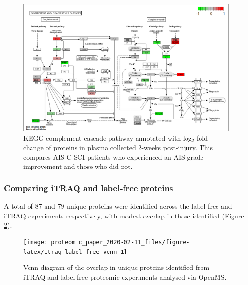 \documentclass[9pt,lineno]{elife}
\begin{document}
\begin{figure}

{\centering \includegraphics[width=18.31in]{figures/kegg_pathways/hsa04610.pathview_label-free} 

}

\caption{KEGG complement cascade pathway annotated with log\(_2\) fold change of proteins in plasma collected 2-weeks post-injury. This compares AIS C SCI patients who experienced an AIS grade improvement and those who did not.}\label{fig:kegg-complement-chap4}
\end{figure}

\hypertarget{comparing-itraq-and-label-free-proteins}{%
\subsubsection{Comparing iTRAQ and label-free proteins}\label{comparing-itraq-and-label-free-proteins}}

A total of 87 and 79 unique proteins were identified across the label-free and iTRAQ experiments respectively, with modest overlap in those identified (Figure \ref{fig:itraq-label-free-venn}).



\begin{figure}

{\centering \texttt{[image: proteomic\_paper\_2020-02-11\_files/figure-latex/itraq-label-free-venn-1]} 

}

\caption{Venn diagram of the overlap in unique proteins identified from iTRAQ and label-free proteomic experiments analysed via OpenMS.}\label{fig:itraq-label-free-venn}
\end{figure}
\end{document}
